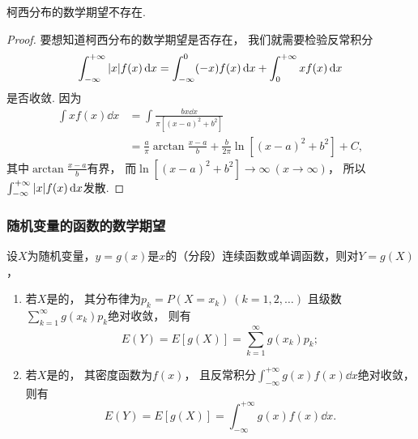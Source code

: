 \begin{proposition}
柯西分布的数学期望不存在.
\begin{proof}
要想知道柯西分布的数学期望是否存在，
我们就需要检验反常积分\begin{equation*}
	\int_{-\infty}^{+\infty} \abs{x} f(x) \dd{x}
	= \int_{-\infty}^0 (-x) f(x) \dd{x}
	+ \int_0^{+\infty} x f(x) \dd{x}
\end{equation*}是否收敛.
因为\begin{align*}
	\int x f(x) \dd{x}
	&= \int \frac{b x \dd{x}}{\pi[(x-a)^2+b^2]} \\
	&= \frac{a}{\pi} \arctan\frac{x-a}{b} + \frac{b}{2\pi} \ln[(x-a)^2+b^2] + C,
\end{align*}
其中\(\arctan\frac{x-a}{b}\)有界，
而\(\ln[(x-a)^2+b^2]\to\infty\ (x\to\infty)\)，
所以\(\int_{-\infty}^{+\infty} \abs{x} f(x) \dd{x}\)发散.
\end{proof}
\end{proposition}

\subsubsection{随机变量的函数的数学期望}
\begin{theorem}\label{theorem:随机变量的数字特征.一维随机变量的函数的数学期望}
设\(X\)为随机变量，\(y=g(x)\)是\(x\)的（分段）连续函数或单调函数，则对\(Y=g(X)\)，
\begin{enumerate}
	\item 若\(X\)是的，
	其分布律为\(p_k = P(X=x_k)\ (k=1,2,\dotsc)\)
	且级数\(\sum_{k=1}^\infty g(x_k) p_k\)绝对收敛，
	则有\begin{equation*}
		E(Y) = E[g(X)] = \sum_{k=1}^\infty {g(x_k) p_k};
	\end{equation*}
	\item 若\(X\)是的，
	其密度函数为\(f(x)\)，
	且反常积分\(\int_{-\infty}^{+\infty} g(x) f(x) \dd{x}\)绝对收敛，
	则有\begin{equation*}
		E(Y) = E[g(X)] = \int_{-\infty}^{+\infty} g(x) f(x) \dd{x}.
	\end{equation*}
\end{enumerate}
\end{theorem}

